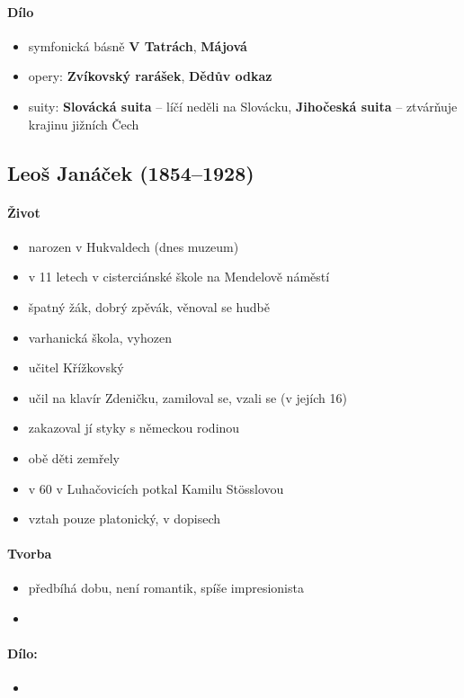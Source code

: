 \paragraph{Dílo}
\begin{itemize}
\item symfonická básně \textbf{V Tatrách}, \textbf{Májová}
\item opery: \textbf{Zvíkovský rarášek}, \textbf{Dědův odkaz}
\item suity: \textbf{Slovácká suita} -- líčí neděli na Slovácku, \textbf{Jihočeská suita} -- ztvárňuje krajinu jižních Čech
\end{itemize}


\subsection{Leoš Janáček (1854--1928)} 
\paragraph{Život}
\begin{itemize}
\item narozen v Hukvaldech (dnes muzeum)
\item v 11 letech v cisterciánské škole na Mendelově náměstí
\item špatný žák, dobrý zpěvák, věnoval se hudbě
\item varhanická škola, vyhozen
\item učitel Křížkovský
\item učil na klavír Zdeničku, zamiloval se, vzali se (v jejích 16)
\item zakazoval jí styky s německou rodinou
\item obě děti zemřely
\item v 60 v Luhačovicích potkal Kamilu Stösslovou
\item vztah pouze platonický, v dopisech
\end{itemize}

\paragraph{Tvorba}
\begin{itemize}
\item předbíhá dobu, není romantik, spíše impresionista
\item 
\end{itemize}

\paragraph{Dílo:}
\begin{itemize}
\item 
\end{itemize}

